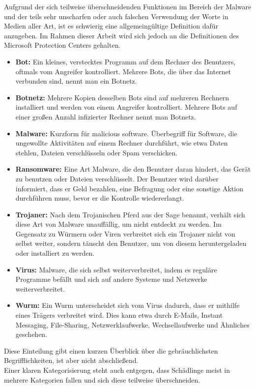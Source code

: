 Aufgrund der sich teilweise überschneidenden Funktionen im Bereich der Malware und der teils sehr unscharfen oder auch falschen Verwendung der Worte in Medien aller Art, ist es schwierig eine allgemeingültige Definition dafür anzugeben. Im Rahmen dieser Arbeit wird sich jedoch an die Definitionen des Microsoft Protection Centers \cite{malware_pc} gehalten.

		\begin{itemize}
			\item \textbf{Bot:} Ein kleines, verstecktes Programm auf dem Rechner des Benutzers, oftmals vom Angreifer kontrolliert. Mehrere Bots, die über das Internet verbunden sind, nennt man ein Botnetz.
			\item \textbf{Botnetz:} Mehrere Kopien des­sel­ben Bots sind auf mehreren Rechnern installiert und werden von einem Angreifer kontrolliert. Mehrere Bots auf einer großen Anzahl infizierter Rechner nennt man Botnetz.
			\item \textbf{Malware:}	Kurzform für \glqq malicious software\grqq. Überbegriff für Software, die ungewollte Aktivitäten auf einem Rechner durchführt, wie etwa Daten stehlen, Dateien verschlüsseln oder Spam verschicken.
			\item \textbf{Ransomware:} Eine Art Malware, die den Benutzer daran hindert, das Gerät zu benutzen oder Dateien verschlüsselt. Der Benutzer wird darüber informiert, dass er Geld bezahlen, eine Befragung oder eine sonstige Aktion durchführen muss, bevor er die Kontrolle wiedererlangt.
			\item \textbf{Trojaner:} Nach dem Trojanischen Pferd aus der Sage benannt, verhält sich diese Art von Malware unauffällig, um nicht entdeckt zu werden. Im Gegensatz zu Würmern oder Viren verbreitet sich ein Trojaner nicht von selbst weiter, sondern täuscht den Benutzer, um von diesem heruntergeladen oder installiert zu werden.
			\item \textbf{Virus:} Malware, die sich selbst weiterverbreitet, indem es reguläre Programme befällt und sich auf andere Systeme und Netzwerke weiterverbreitet.
			\item \textbf{Wurm:} Ein Wurm unterscheidet sich vom Virus dadurch, dass er mithilfe eines Trägers verbreitet wird. Dies kann etwa durch E-Mails, Instant Messaging, File-Sharing, Netzwerklaufwerke, Wechsellaufwerke und Ähnliches geschehen.
		\end{itemize}
Diese Einteilung gibt einen kurzen Überblick über die gebräuchlichsten Begrifflichkeiten, ist aber nicht abschließend. \\
Einer klaren Kategorisierung steht auch entgegen, dass Schädlinge meist in mehrere Kategorien fallen und sich diese teilweise überschneiden.